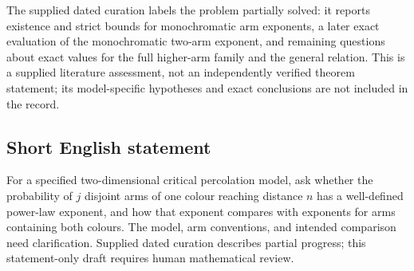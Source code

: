 \documentclass[11pt]{article}
\begin{document}
The supplied dated curation labels the problem partially solved: it reports existence and strict bounds for monochromatic arm exponents, a later exact evaluation of the monochromatic two-arm exponent, and remaining questions about exact values for the full higher-arm family and the general relation. This is a supplied literature assessment, not an independently verified theorem statement; its model-specific hypotheses and exact conclusions are not included in the record.
\subsection{Short English statement}
For a specified two-dimensional critical percolation model, ask whether the probability of \(j\) disjoint arms of one colour reaching distance \(n\) has a well-defined power-law exponent, and how that exponent compares with exponents for arms containing both colours. The model, arm conventions, and intended comparison need clarification. Supplied dated curation describes partial progress; this statement-only draft requires human mathematical review.
\end{document}
